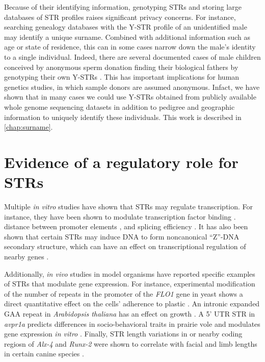 Because of their identifying information, genotyping STRs and storing large databases of STR profiles raises significant privacy concerns. For instance, searching genealogy databases with the Y-STR profile of an unidentified male may identify a unique surname. Combined with additional information such as age or state of residence, this can in some cases narrow down the male's identity to a single individual. Indeed, there are several documented cases of male children conceived by anonymous sperm donation finding their biological fathers by genotyping their own Y-STRs \cite{Motluk2005,Lehmann-Haupt2010}. This has important implications for human genetics studies, in which sample donors are assumed anonymous. Infact, we have shown that in many cases we could use Y-STRs obtained from publicly available whole genome sequencing datasets in addition to pedigree and geographic information to uniquely identify these individuals. This work is described in \autoref{chap:surname}. 

\section{Evidence of a regulatory role for STRs}
Multiple \emph{in vitro} studies have shown that STRs may regulate transcription. For instance, they have been shown to modulate transcription factor binding \cite{ContenteDittmerKochEtAl2002,MartinMakepeaceHillEtAl2005}. distance between promoter elements \cite{WillemsPaulHeideEtAl1990,YogevRosengartenWatson-McKownEtAl1991}, and splicing efficiency \cite{HefferonGromanYurkEtAl2004,HuiHungHeinerEtAl2005}. It has also been shown that certain STRs may induce DNA to form noncanonical ``Z''-DNA secondary structure, which can have an effect on transcriptional regulation of nearby genes \cite{RothenburgKoch-NolteRichEtAl2001}.

Additionally, \emph{in vivo} studies in model organisms have reported specific examples of STRs that modulate gene expression. 
For instance, experimental modification of the number of repeats in the promoter of the \emph{FLO1} gene in yeast shows a direct quantitative effect on the cells' adherence to plastic \cite{VerstrepenJansenLewitterEtAl2005}.
An intronic expanded GAA repeat in \emph{Arabidopsis thaliana} has an effect on growth \cite{SureshkumarTodescoSchneebergerEtAl2009}.
A 5' UTR STR in \emph{avpr1a} predicts differences in socio-behavioral traits in prairie vole and modulates gene expression \emph{in vitro} \cite{HammockYoung2005}.
Finally, STR length variations in or nearby coding regiosn of \emph{Alx-4} and \emph{Runx-2} were shown to correlate with facial and limb lengths in certain canine species \cite{FondonGarner2004}.

